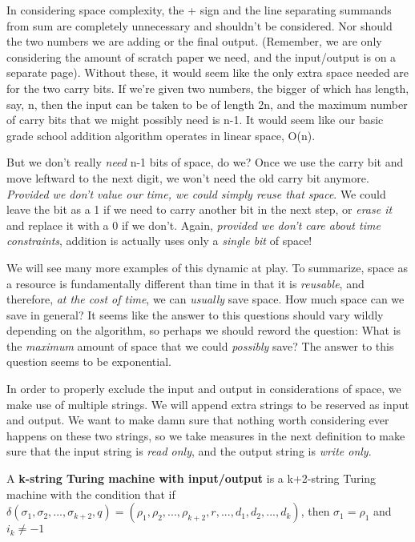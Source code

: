 In considering space complexity, the + sign and the line separating summands from sum are completely unnecessary and shouldn't be considered. Nor should the two numbers we are adding or the final output. (Remember, we are only considering the amount of scratch paper we need, and the input/output is on a separate page). Without these, it would seem like the only extra space needed are for the two carry bits. If we're given two numbers, the bigger of which has length, say, n, then the input can be taken to be of length 2n, and the maximum number of carry bits that we might possibly need is n-1. It would seem like our basic grade school addition algorithm operates in linear space, O(n).

But we don't really \textit{need} n-1 bits of space, do we? Once we use the carry bit and move leftward to the next digit, we won't need the old carry bit anymore. \textit{Provided we don't value our time, we could simply reuse that space}. We could leave the bit as a 1 if we need to carry another bit in the next step, or \textit{erase it} and replace it with a 0 if we don't. Again, \textit{provided we don't care about time constraints}, addition is actually uses only a \textit{single bit} of space!

We will see many more examples of this dynamic at play. To summarize, space as a resource is fundamentally different than time in that it is \textit{reusable}, and therefore, \textit{at the cost of time}, we can \textit{usually} save space. How much space can we save in general? It seems like the answer to this questions should vary wildly depending on the algorithm, so perhaps we should reword the question: What is the \textit{maximum} amount of space that we could \textit{possibly} save? The answer to this question seems to be exponential.  

In order to properly exclude the input and output in considerations of space, we make use of multiple strings. We will append extra strings to be reserved as input and output. We want to make damn sure that nothing worth considering ever happens on these two strings, so we take measures in the next definition to make sure that the input string is \textit{read only}, and the output string is \textit{write only}.
\begin{definition}
A \textbf{k-string Turing machine with input/output} is a k+2-string Turing machine with the condition that if $\delta(\sigma_1,\sigma_2,...,\sigma_{k+2},q)=(\rho_1,\rho_2,...,\rho_{k+2},r,...,d_1,d_2,...,d_k)$, then $\sigma_1 = \rho_1$ and $i_k \neq -1$
\end{definition}

